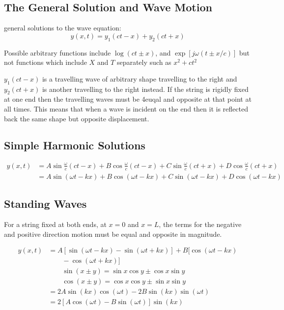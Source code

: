 \documentclass[10pt, a4paper, twocolumn]{article}
\begin{document}
\subsection{The General Solution and Wave Motion}

general solutions to the wave equation:
\[ y(x,t) = y_1 (ct - x) + y_2 (ct + x) \]

Possible arbitrary functions include $\log (ct \pm x)$, and $\exp [j \omega (t \pm x/c)]$ but not functions which include $X$ and $T$ separately such as $x^2 + ct^2$

$y_1 (ct - x)$ is a travelling wave of arbitrary shape travelling to the right and $y_2 (ct + x)$ is another travelling to the right instead. If the string is rigidly fixed at one end then the travelling waves must be 4euqal and opposite at that point at all times. This means that when a wave is incident on the end then it is reflected back the same shape but opposite displacement.

\subsection{Simple Harmonic Solutions}

\begin{equation*}
\begin{aligned}
y(x,t) &= A \sin \frac{\omega}{c} (ct -x)
+ B \cos \frac{\omega }{c} (ct - x)
+ C \sin \frac{\omega}{c} (ct + x)
+ D \cos \frac{\omega}{c} (ct +x)
\\ &= A \sin (\omega t - kx)
+ B \cos (\omega t - kx)
+ C \sin (\omega t - kx) + D \cos (\omega t - kx)
\end{aligned}
\end{equation*}

\subsection{Standing Waves}

For a string fixed at both ends, at $x= 0$ and $x=L$, the terms for the negative and positive direction motion must be equal and opposite in magnitude.

\begin{equation*}
\begin{aligned}
y(x,t) &= A[\sin(\omega t - kx ) - \sin (\omega t + kx)]
+ B[\cos(\omega t - kx )
	\\ & \qquad - \cos (\omega t + kx)]
\\ & \qquad \sin (x \pm y) = \sin x \cos y \pm \cos x \sin y
\\ & \qquad \cos (x \pm y) = \cos x \cos y \pm \sin x \sin y
\\ &= 2A \sin (kx) \cos (\omega t)
- 2 B \sin (kx) \sin (\omega t)
\\ &= 2[A \cos (\omega t) - B \sin (\omega t)] \sin (kx)
\end{aligned}
\end{equation*}
\end{document}
